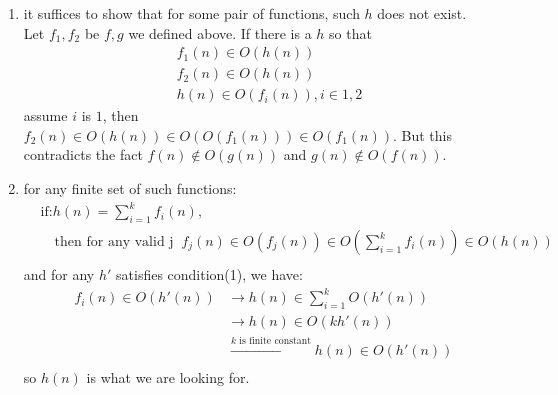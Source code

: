 \documentclass[paper=a4, fontsize=11pt]{scrartcl} %
\numberwithin{equation}{section} %
\numberwithin{figure}{section} %
\numberwithin{table}{section} %
\begin{document}
{\begin{enumerate}[label={4.\arabic*}]
  \item it suffices to show that for some pair of functions, such $h$ does not exist.\\
    Let $f_1,f_2$ be $f,g$ we defined above. If there is a $h$ so that 
    \begin{align*}
      & f_1(n) \in O(h(n)) \\
      & f_2(n) \in O(h(n)) \\
      & h(n) \in O(f_i(n)), i \in {1,2}
    \end{align*}
    assume $i$ is $1$, then $f_2(n) \in O(h(n)) \in O(O(f_1(n))) \in O(f_1(n))$. But this
    contradicts the fact $f(n) \notin O(g(n))$ and $g(n) \notin O(f(n))$.

  \item for any finite set of such functions:
    \begin{align*}
      &\text{if:} h(n)= \sum^{k}_{i=1}f_i(n), \\
      &\quad \text{then for any valid j}\;\; f_j(n) \in O(f_j(n)) \in O(\sum^{k}_{i=1}f_i(n)) \in O(h(n)) \\
    \end{align*}
    and for any $h'$ satisfies condition(1), we have:
    \begin{align*}
      f_i(n) \in O(h'(n)) & \rightarrow h(n) \in \sum^{k}_{i=1}O(h'(n)) \\
			  & \rightarrow h(n) \in O(kh'(n))\\
     			  & \xrightarrow{\text{$k$ is finite constant}} h(n) \in O(h'(n))\\
    \end{align*}
    so $h(n)$ is what we are looking for.
\end{enumerate}

}
\end{document}
